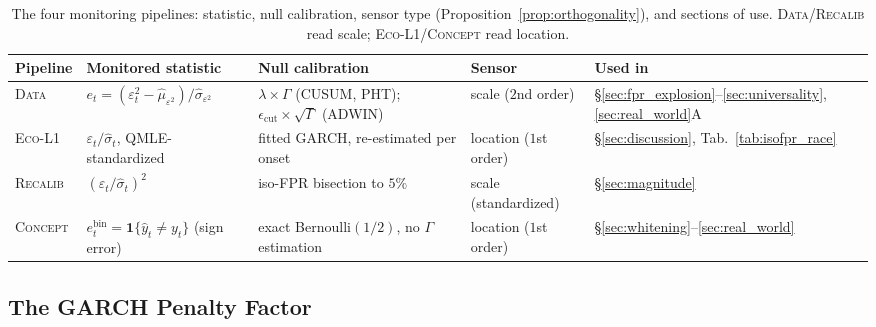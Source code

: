 \documentclass[sigconf,anonymous,review]{acmart}
\theoremstyle{acmdefinition}
\begin{document}
\begin{table}[t]
    \centering
    \caption{The four monitoring pipelines: statistic, null calibration, sensor type (Proposition~\ref{prop:orthogonality}), and sections of use. \textsc{Data}/\textsc{Recalib} read scale; \textsc{Eco-L1}/\textsc{Concept} read location.}
    \label{tab:pipelines}
    \small
    \begin{tabular}{@{}lllll@{}}
        \toprule
        \textbf{Pipeline} & \textbf{Monitored statistic}                                               & \textbf{Null calibration}                                                                & \textbf{Sensor}        & \textbf{Used in}                                                         \\
        \midrule
        \textsc{Data}     & $e_t=(\varepsilon_t^2-\hat\mu_{\varepsilon^2})/\hat\sigma_{\varepsilon^2}$ & $\lambda\times\Gamma$ (CUSUM, PHT); $\epsilon_{\mathrm{cut}}\times\sqrt{\Gamma}$ (ADWIN) & scale ($2$nd order)    & \S\ref{sec:fpr_explosion}--\ref{sec:universality}, \ref{sec:real_world}A \\
        \textsc{Eco-L1}   & $\varepsilon_t/\hat\sigma_t$, QMLE-standardized                            & fitted GARCH, re-estimated per onset                                                     & location ($1$st order) & \S\ref{sec:discussion}, Tab.~\ref{tab:isofpr_race}                       \\
        \textsc{Recalib}  & $(\varepsilon_t/\hat\sigma_t)^2$                                           & iso-FPR bisection to $5\%$                                                               & scale (standardized)   & \S\ref{sec:magnitude}                                                    \\
        \textsc{Concept}  & $e^{\mathrm{bin}}_t=\mathbf{1}\{\hat y_t\neq y_t\}$ (sign error)           & exact Bernoulli$(1/2)$, no $\Gamma$ estimation                                           & location ($1$st order) & \S\ref{sec:whitening}--\ref{sec:real_world}                              \\
        \bottomrule
    \end{tabular}
\end{table}

\subsection{The GARCH Penalty Factor}\label{sec:garch}
\end{document}
